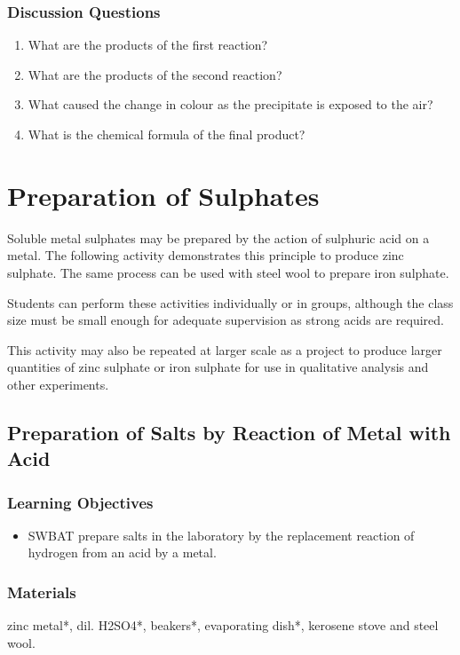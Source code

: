 \subsubsection*{Discussion Questions}
\begin{enumerate}
\item{What are the products of the first reaction?}
\item{What are the products of the second reaction?}
\item{What caused the change in colour as the precipitate is exposed to the air?}
\item{What is the chemical formula of the final product?}
\end{enumerate}

\section{Preparation of Sulphates}

Soluble metal sulphates may be prepared by the action of sulphuric acid on a metal. The following activity demonstrates this principle to produce zinc sulphate. The same process can be used with steel wool to prepare iron sulphate.

Students can perform these activities individually or in groups, although the class size must be small enough for adequate supervision as strong acids are required.

This activity may also be repeated at larger scale as a project to produce larger quantities of zinc sulphate or iron sulphate for use in qualitative analysis and other experiments.

\subsection{Preparation of Salts by Reaction of Metal with Acid}

\subsubsection*{Learning Objectives}
\begin{itemize}
\item{SWBAT prepare salts in the laboratory by the replacement reaction of hydrogen from an acid by a metal.}
\end{itemize}

\subsubsection*{Materials}
zinc metal*, dil. H2SO4*, beakers*, evaporating dish*, kerosene stove and steel wool.


